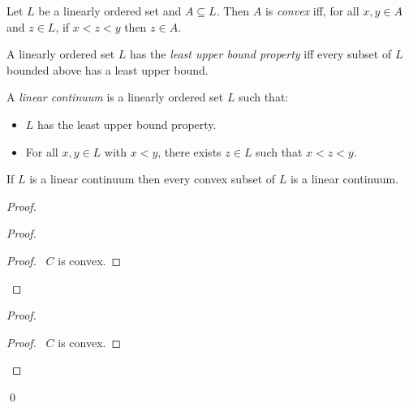 \begin{df}[Convex]
  Let $L$ be a linearly ordered set and $A \subseteq L$. Then $A$ is
  \emph{convex} iff, for all $x, y \in A$ and $z \in L$, if $x < z < y$ then
  $z \in A$.
\end{df}

\begin{df}
  A linearly ordered set $L$ has the \emph{least upper bound property} iff
  every subset of $L$ bounded above has a least upper bound.
\end{df}

\begin{df}
  A \emph{linear continuum} is a linearly ordered set $L$ such that:
  \begin{itemize}
    \item $L$ has the least upper bound property.
    \item For all $x, y \in L$ with $x < y$, there exists $z \in L$ such that
    $x < z < y$.
  \end{itemize}
\end{df}

\begin{prop}
  If $L$ is a linear continuum then every convex subset of $L$ is a linear
  continuum.
\end{prop}

\begin{proof}
  \pf
  \begin{proof}
    \begin{proof}
      \pf\ $C$ is convex.
    \end{proof}
  \end{proof}
  \begin{proof}
    \pf
    \begin{proof}
      \pf\ $C$ is convex.
    \end{proof}
  \end{proof}
  \qed
\end{proof}

